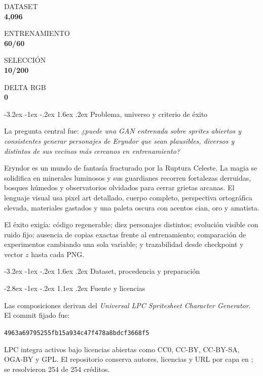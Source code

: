 \documentclass[11pt]{article}
\makeatletter
\renewcommand\section{\@startsection{section}{1}{\z@}%
  {-3.2ex \@plus -1ex \@minus -.2ex}%
  {1.6ex \@plus .2ex}%
  {\normalfont\Large\bfseries\color{DeepPurple}}}
\renewcommand\subsection{\@startsection{subsection}{2}{\z@}%
  {-2.8ex \@plus -1ex \@minus -.2ex}%
  {1.1ex \@plus .2ex}%
  {\normalfont\large\bfseries\color{CosmicBlue}}}
\newcommand{\metric}[2]{%
  \begin{minipage}[t]{0.22\textwidth}
    \colorbox{Paper}{\parbox[c][0.75in][c]{0.94\linewidth}{\centering
      {\scriptsize\color{CosmicBlue}\MakeUppercase{#1}}\\[3pt]
      {\Large\bfseries\color{DeepPurple}#2}}}
  \end{minipage}
}
\makeatother
\begin{document}
\begin{center}
\metric{Dataset}{4,096}\hfill
\metric{Entrenamiento}{60/60}\hfill
\metric{Selección}{10/200}\hfill
\metric{Delta RGB}{0}
\end{center}

\tableofcontents
\newpage

\section{Problema, universo y criterio de éxito}

La pregunta central fue: \emph{¿puede una GAN entrenada sobre sprites abiertos y consistentes generar personajes de Eryndor que sean plausibles, diversos y distintos de sus vecinos más cercanos en entrenamiento?}

Eryndor es un mundo de fantasía fracturado por la Ruptura Celeste. La magia se solidifica en minerales luminosos y sus guardianes recorren fortalezas derruidas, bosques húmedos y observatorios olvidados para cerrar grietas arcanas. El lenguaje visual usa pixel art detallado, cuerpo completo, perspectiva ortográfica elevada, materiales gastados y una paleta oscura con acentos cian, oro y amatista.

El éxito exigía: código regenerable; diez personajes distintos; evolución visible con ruido fijo; ausencia de copias exactas frente al entrenamiento; comparación de experimentos cambiando una sola variable; y trazabilidad desde checkpoint y vector $z$ hasta cada PNG.

\section{Dataset, procedencia y preparación}

\subsection{Fuente y licencias}

Las composiciones derivan del \emph{Universal LPC Spritesheet Character Generator}. El commit fijado fue:

\begin{center}
\small\texttt{4963a69795255fb15a934c47f478a8bdcf3668f5}
\end{center}

LPC integra activos bajo licencias abiertas como CC0, CC-BY, CC-BY-SA, OGA-BY y GPL. El repositorio conserva autores, licencias y URL por capa en ; se resolvieron 254 de 254 créditos.
\end{document}
